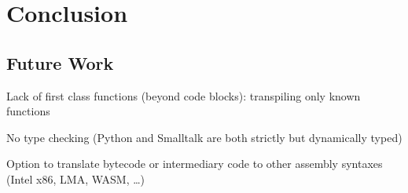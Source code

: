 
\chapter{Conclusion} \label{ch_conclusion}

\section{Future Work} \label{sc_future}

\begin{todo}
\item Lack of first class functions (beyond code blocks): transpiling only known functions
\item No type checking (Python and Smalltalk are both strictly but dynamically typed)
\item Option to translate bytecode or intermediary code to other assembly syntaxes (Intel x86, LMA, WASM, \dots)
\end{todo}
